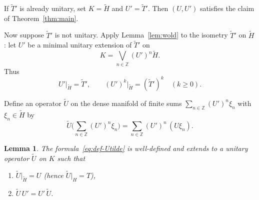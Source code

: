\documentclass[11pt]{article}
\newtheorem{lemma}[theorem]{Lemma}
\begin{document}
If \(\widetilde{T}'\) is already unitary, set \(K=\widetilde{H}\) and \(U'=\widetilde{T}'\).
Then \((U,U')\) satisfies the claim of Theorem~\ref{thm:main}.

Now suppose \(\widetilde{T}'\) is not unitary. Apply Lemma~\ref{lem:wold} to the
isometry \(\widetilde{T}'\) on \(\widetilde{H}\): let \(U'\) be a minimal unitary
extension of \(\widetilde{T}'\) on
\begin{equation}
\label{eq:K}
K
=
\bigvee_{n\in\mathbb{Z}}(U')^n\widetilde{H}.
\end{equation}
Thus
\begin{equation}
\label{eq:Uprime-powers}
U'\big|_{\widetilde{H}}=\widetilde{T}',
\qquad
(U')^k\big|_{\widetilde{H}}=(\widetilde{T}')^k\quad(k\ge 0).
\end{equation}

Define an operator \(\widetilde{U}\) on the dense manifold of finite sums
\(\sum_{n\in\mathbb{Z}}(U')^n\xi_n\) with \(\xi_n\in\widetilde{H}\) by
\begin{equation}
\label{eq:def-Utilde}
\widetilde{U}\Biggl(\sum_{n\in\mathbb{Z}}(U')^n\xi_n\Biggr)
=
\sum_{n\in\mathbb{Z}}(U')^n\,(U\xi_n).
\end{equation}

\begin{lemma}
\label{lem:Utilde}
The formula~\eqref{eq:def-Utilde} is well-defined and extends to a unitary
operator \(\widetilde{U}\) on \(K\) such that
\begin{enumerate}
\item[\rm(i)] \(\widetilde{U}\big|_{\widetilde{H}}=U\) (hence \(\widetilde{U}\big|_H=T\)),
\item[\rm(ii)] \(\widetilde{U}\,U'=U'\,\widetilde{U}\).
\end{enumerate}
\end{lemma}
\end{document}
